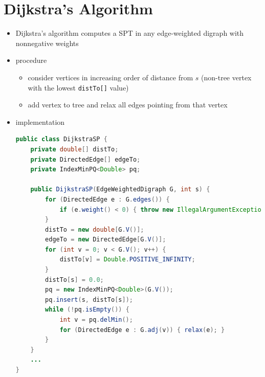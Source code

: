 \documentclass[8pt,a4paper,compress]{beamer}
\begin{document}
\section{Dijkstra's Algorithm}
\begin{frame}[fragile]
\begin{itemize}
\item Dijkstra's algorithm computes a SPT in any edge-weighted
digraph with nonnegative weights

\item procedure
\begin{itemize}
\item consider vertices in increasing order of distance from $s$ (non-tree vertex with the lowest \lstinline{distTo[]} value)

\item add vertex to tree and relax all edges pointing from that vertex
\end{itemize}

\item implementation
\begin{lstlisting}[language=Java]
public class DijkstraSP {
    private double[] distTo; 
    private DirectedEdge[] edgeTo; 
    private IndexMinPQ<Double> pq; 
    
    public DijkstraSP(EdgeWeightedDigraph G, int s) {
        for (DirectedEdge e : G.edges()) {
            if (e.weight() < 0) { throw new IllegalArgumentException(...); }
        }
        distTo = new double[G.V()];
        edgeTo = new DirectedEdge[G.V()];
        for (int v = 0; v < G.V(); v++) { 
            distTo[v] = Double.POSITIVE_INFINITY; 
        }
        distTo[s] = 0.0;
        pq = new IndexMinPQ<Double>(G.V());
        pq.insert(s, distTo[s]);
        while (!pq.isEmpty()) {
            int v = pq.delMin();
            for (DirectedEdge e : G.adj(v)) { relax(e); }
        }
    }    
    ...
}
\end{lstlisting}
\end{itemize}
\end{frame}
\end{document}
